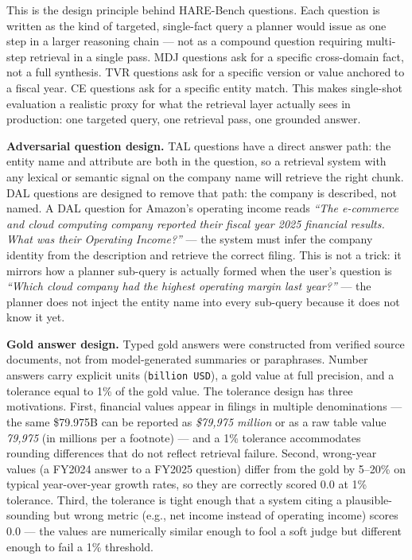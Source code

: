 This is the design principle behind HARE-Bench questions. Each question is written as the kind of targeted, single-fact query a planner would issue as one step in a larger reasoning chain --- not as a compound question requiring multi-step retrieval in a single pass. MDJ questions ask for a specific cross-domain fact, not a full synthesis. TVR questions ask for a specific version or value anchored to a fiscal year. CE questions ask for a specific entity match. This makes single-shot evaluation a realistic proxy for what the retrieval layer actually sees in production: one targeted query, one retrieval pass, one grounded answer.

\textbf{Adversarial question design.} TAL questions have a direct answer path: the entity name and attribute are both in the question, so a retrieval system with any lexical or semantic signal on the company name will retrieve the right chunk. DAL questions are designed to remove that path: the company is described, not named. A DAL question for Amazon's operating income reads \emph{``The e-commerce and cloud computing company reported their fiscal year 2025 financial results. What was their Operating Income?''} --- the system must infer the company identity from the description and retrieve the correct filing. This is not a trick: it mirrors how a planner sub-query is actually formed when the user's question is \emph{``Which cloud company had the highest operating margin last year?''} --- the planner does not inject the entity name into every sub-query because it does not know it yet.

\textbf{Gold answer design.} Typed gold answers were constructed from verified source documents, not from model-generated summaries or paraphrases. Number answers carry explicit units (\texttt{billion\ USD}), a gold value at full precision, and a tolerance equal to 1\% of the gold value. The tolerance design has three motivations. First, financial values appear in filings in multiple denominations --- the same \$79.975B can be reported as \emph{\$79,975 million} or as a raw table value \emph{79,975} (in millions per a footnote) --- and a 1\% tolerance accommodates rounding differences that do not reflect retrieval failure. Second, wrong-year values (a FY2024 answer to a FY2025 question) differ from the gold by 5--20\% on typical year-over-year growth rates, so they are correctly scored 0.0 at 1\% tolerance. Third, the tolerance is tight enough that a system citing a plausible-sounding but wrong metric (e.g., net income instead of operating income) scores 0.0 --- the values are numerically similar enough to fool a soft judge but different enough to fail a 1\% threshold.

